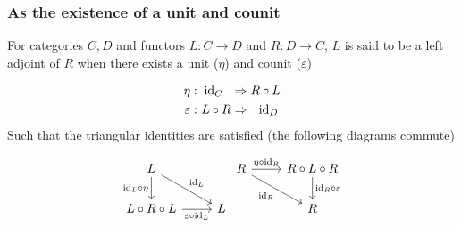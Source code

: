 \subsubsection*{As the existence of a unit and counit}
For categories $C,D$ and functors $L: C\to D$ and $R: D\to C$, $L$ is said to
be a left adjoint of $R$ when there exists a unit ($\eta$) and counit
($\varepsilon$)

\begin{equation*}
  \begin{aligned}
    \eta&:\\
    \varepsilon&:
  \end{aligned}
  \ \begin{aligned}
    \mathrm{id}_C\ \ &\Rightarrow R \circ L\\
    L \circ R &\Rightarrow\ \ \mathrm{id}_D
  \end{aligned}
\end{equation*}
Such that the triangular identities are satisfied (the following diagrams commute)

\[\begin{tikzcd}
	L \\
	{L\circ R\circ L} & L
	\arrow["{\id_L\circ\eta}"', from=1-1, to=2-1]
	\arrow["{\varepsilon\circ \id_L}"', from=2-1, to=2-2]
	\arrow["{\id_L}", from=1-1, to=2-2]
\end{tikzcd}
\begin{tikzcd}
	R & {R\circ L\circ R} \\
	& R
	\arrow["{\eta\circ\id_R}", from=1-1, to=1-2]
	\arrow["{\id_R \circ \varepsilon}", from=1-2, to=2-2]
	\arrow["{\id_R}"', from=1-1, to=2-2]
\end{tikzcd}\]

